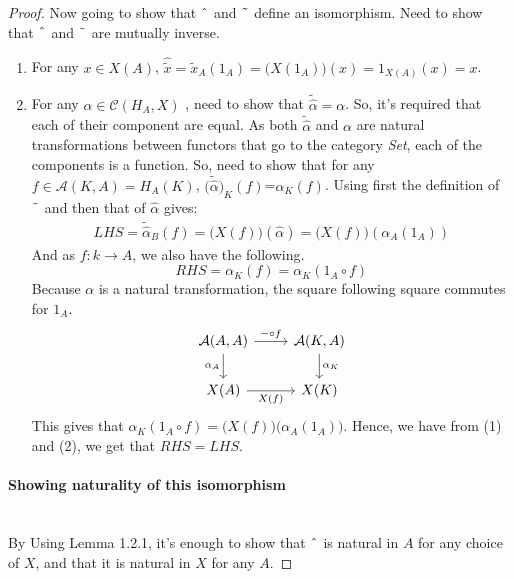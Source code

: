 \documentclass[18pt,a4paper]{article}
\theoremstyle{definition}
\begin{document}
\begin{proof}
	Now going to show that $\string ^$ and $\string ~$ define an isomorphism.
	Need to show that $\string ^ $ and $\string ~ $ are mutually inverse.
	\begin{enumerate}[label=(\roman*)]
		\item  For any $x \in X(A)$,
		$\hat{\tilde{x}}=\tilde{x}_A (1_A)=\Big(X(1_A) \Big) (x)=1_{X(A)}(x)=x$.
	\item For any $\alpha \in \mathcal{C} (H_A,X)$ , need to show that $\tilde{\hat{\alpha}}=\alpha$.
		So, it's required that each of their component are equal.
		As both $\tilde{\hat{\alpha}}$ and $\alpha$ are natural transformations
	between functors that go to the category \textit{Set}, each of the components is a function.
	So, need to show that for any $f \in \mathcal{A} (K,A)=H_A(K)$,
	$\Big(\tilde{\hat{\alpha}}\Big)_K(f)$=$\alpha_K(f)$.
	Using first the definition of $ \string ~$ and then that of $\hat{\alpha}$ gives:
	\begin{align}
	LHS=\tilde{\hat{\alpha}}_B(f)=\Big(X(f)\Big)(\hat{\alpha})=\Big(X(f)\Big)(\alpha_A(1_A))
	\end{align}
	And as $f:k \to A$, we also have the following.
	\begin{equation}
		RHS=\alpha_K(f)= \alpha_K(1_A \circ f)
	\end{equation}
	Because $\alpha$ is a natural transformation, the square following square commutes for $1_A$.
	\[\begin{tikzcd}
		\mathcal{A} (A,A) \arrow[swap]{d}{\alpha_A} \arrow{r}{- \circ f}
	& \mathcal{A} (K,A) \arrow{d}{\alpha_K}\\
	X(A) \arrow[swap]{r}{X(f)}
	& X(K)
	\end{tikzcd}\]
	This gives that $\alpha_K(1_A \circ f)=\Big(X(f) \Big) \big( \alpha_A (1_A) \big)$.
	Hence, we have from (1) and (2), we get that $RHS=LHS$.
	\end{enumerate}
\paragraph{Showing naturality of this isomorphism }\mbox{} \\
By Using Lemma 1.2.1, it's enough to show that $\string ^$
is natural in $A$ for any choice of $X$, and that it is natural in $X$ for any $A$.


\end{proof}
\end{document}
